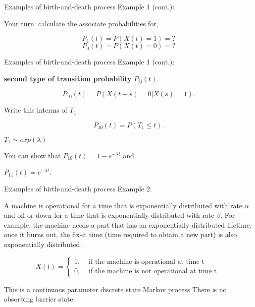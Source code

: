 \documentclass[12pt,ignorenonframetext,]{beamer}
\begin{document}
\begin{frame}{Examples of birth-and-death process}
\protect\hypertarget{examples-of-birth-and-death-process-2}{}
Example 1 (cont.):

Your turn: calculate the associate probabilities for,

\[P_1(t) = P(X(t)=1)= ?\] \[P_0(t) = P(X(t)=0)= ?\]
\end{frame}

\begin{frame}{Examples of birth-and-death process}
\protect\hypertarget{examples-of-birth-and-death-process-3}{}
Example 1 (cont.):

\textbf{second type of transition probability} \(P_{ij}(t)\).

\[P_{10}(t) = P(X(t+s)=0|X(s)=1).\]

Write this interms of \(T_1\)

\[P_{10}(t) = P(T_1 \leq t).\]

\(T_1 \sim exp(\lambda)\)

You can show that \(P_{10}(t) = 1-e^{-\lambda t}\) and

\(P_{11}(t) = e^{-\lambda t}\).
\end{frame}

\begin{frame}{Examples of birth-and-death process}
\protect\hypertarget{examples-of-birth-and-death-process-4}{}
Example 2:

A machine is operational for a time that is exponentially distributed
with rate \(\alpha\) and off or down for a time that is exponentially
distributed with rate \(\beta\). For example, the machine needs a part
that has an exponentially distributed lifetime; once it burns out, the
fix-it time (time required to obtain a new part) is also exponentially
distributed.

\begin{equation} \label{eq3}
X(t)=\left\{
    \begin{array}{ll}
    1, & \text{ if the machine is operational at time t } \\
      0, & \text{ if the machine is not operational at time t }
  \end{array}
  \right.
\end{equation}

This is a continuous parameter discrete state Markov process There is no
absorbing barrier state.
\end{frame}
\end{document}
